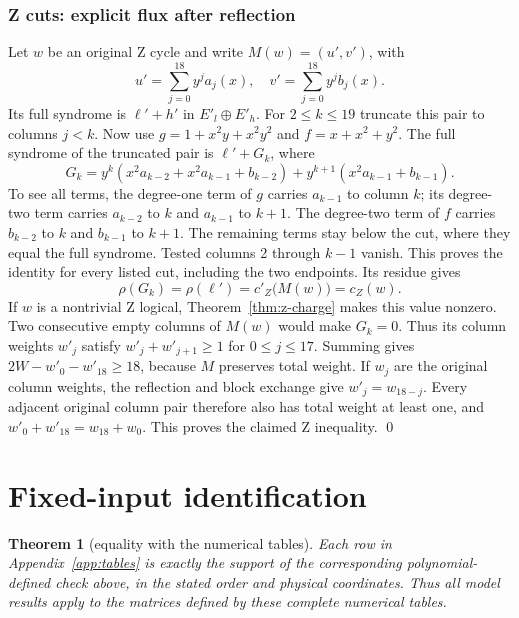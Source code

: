 \documentclass{article}
\newtheorem{theorem}{Theorem}
\begin{document}
\subsubsection{Z cuts: explicit flux after reflection}\label{app:z-cuts}

Let \(w\) be an original Z cycle and write \(M(w) = (u', v')\), with
\begin{equation}
  u' = \sum_{j=0}^{18} y^j a_j(x), \quad
  v' = \sum_{j=0}^{18} y^j b_j(x).
\end{equation}
Its full syndrome is \(\ell' + h'\) in \(E'_l \oplus E'_h\).
For \(2 \le k \le 19\) truncate this pair to columns \(j < k\).
Now use \(g = 1 + x^2 y + x^2 y^2\) and \(f = x + x^2 + y^2\).
The full syndrome of the truncated pair is \(\ell' + G_k\), where
\begin{equation}
  G_k = y^k (x^2 a_{k-2} + x^2 a_{k-1} + b_{k-2})
      + y^{k+1} (x^2 a_{k-1} + b_{k-1}).
\end{equation}
To see all terms, the degree-one term of \(g\) carries \(a_{k-1}\)
to column \(k\); its degree-two term carries \(a_{k-2}\) to \(k\)
and \(a_{k-1}\) to \(k + 1\). The degree-two term of \(f\) carries
\(b_{k-2}\) to \(k\) and \(b_{k-1}\) to \(k + 1\).
The remaining terms stay below the cut, where they equal the full
syndrome. Tested columns 2 through \(k - 1\) vanish. This proves the
identity for every listed cut, including the two endpoints.
Its residue gives
\begin{equation}
  \rho(G_k) = \rho(\ell') = c'_Z\bigl(M(w)\bigr) = c_Z(w).
\end{equation}
If \(w\) is a nontrivial Z logical, Theorem~\ref{thm:z-charge} makes this value nonzero.
Two consecutive empty columns of \(M(w)\) would make \(G_k = 0\).
Thus its column weights \(w'_j\) satisfy
\(w'_j + w'_{j+1} \ge 1\) for \(0 \le j \le 17\). Summing gives
\(2W - w'_0 - w'_{18} \ge 18\), because \(M\) preserves total weight.
If \(w_j\) are the original column weights, the reflection and block
exchange give \(w'_j = w_{18-j}\). Every adjacent original column pair
therefore also has total weight at least one, and
\(w'_0 + w'_{18} = w_{18} + w_0\). This proves the claimed Z inequality. \qed

\section{Fixed-input identification}\label{app:input}

\begin{theorem}[equality with the numerical tables]\label{thm:input}
  Each row in Appendix~\ref{app:tables}
  is exactly the support of the corresponding polynomial-defined check above,
  in the stated order and physical coordinates. Thus all model results apply
  to the matrices defined by these complete numerical tables.
\end{theorem}
\end{document}
